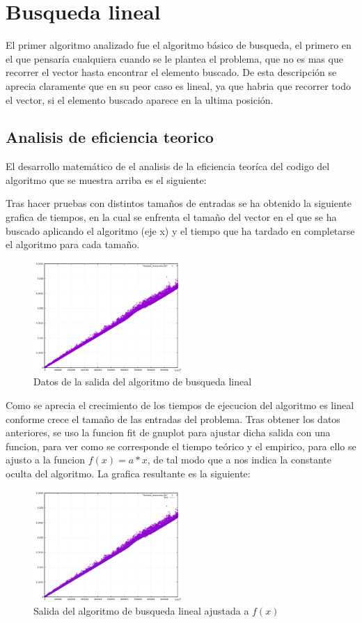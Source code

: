 \section{Busqueda lineal}

El primer algoritmo analizado fue el algoritmo básico de busqueda, el primero en el que pensaría cualquiera cuando se le plantea el problema, que no es mas que recorrer el vector hasta encontrar el elemento buscado. De esta descripción se aprecia claramente que en su peor caso es lineal, ya que habria que recorrer todo el vector, si el elemento buscado aparece en la ultima posición.

\subsection{Analisis de eficiencia teorico}


El desarrollo matemático de el analisis de la eficiencia teoríca del codigo del algoritmo que se muestra arriba es el siguiente:


Tras hacer pruebas con distintos tamaños de entradas se ha obtenido la siguiente grafica de tiempos, en la cual se enfrenta el tamaño del vector en el que se ha buscado aplicando el algoritmo (eje x) y el tiempo que ha tardado en completarse el algoritmo para cada tamaño.

\begin{figure}[h]
  \includegraphics[width=0.5\textwidth]{./Imagenes/busqueda_lineal.png}
  \caption{Datos de la salida del algoritmo de busqueda lineal}
\end{figure}

Como se aprecia el crecimiento de los tiempos de ejecucion del algoritmo es lineal conforme crece el tamaño de las entradas del problema. Tras obtener los datos anteriores, se uso la funcion fit de gnuplot para ajustar dicha salida con una funcion, para ver como se corresponde el tiempo teórico y el empirico, para ello se ajusto a la funcion $ f(x) = a*x$, de tal modo que a nos indica la constante oculta del algoritmo. La grafica resultante es la siguiente:

\begin{figure}[h]
  \includegraphics[width=0.5\textwidth]{./Imagenes/busqueda_lineal_ajustada.png}
  \caption{Salida del algoritmo de busqueda lineal ajustada a $f(x)$}
\end{figure}
